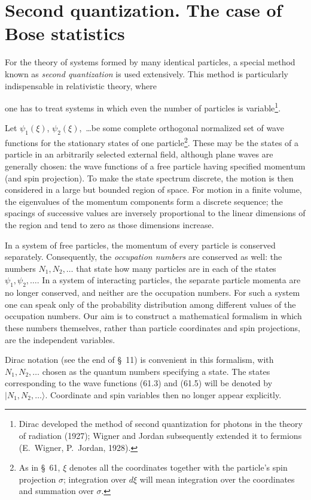 \section{Second quantization. The case of Bose statistics}

For the theory of systems formed by many identical particles, a special
method known as \emph{second quantization} is used extensively. This method is
particularly indispensable in relativistic theory, where

one has to treat systems in which even the number of particles is
variable\footnote{Dirac developed the method of second quantization for
photons in the theory of radiation (1927); Wigner and Jordan subsequently
extended it to fermions (E.~Wigner, P.~Jordan, 1928).}.

Let $\psi_1(\xi)$, $\psi_2(\xi)$,~\dots be some complete orthogonal normalized
set of wave functions for the stationary states of one
particle\footnote{As in \S~61, $\xi$ denotes all the coordinates together
with the particle's spin projection $\sigma$; integration over $d\xi$ will
mean integration over the coordinates and summation over $\sigma$.}. These
may be the states of a particle in an arbitrarily selected external field,
although plane waves are generally chosen: the wave functions of a free
particle having specified momentum (and spin projection). To make the state
spectrum discrete, the motion is then considered in a large but bounded
region of space. For motion in a finite volume, the eigenvalues of the
momentum components form a discrete sequence; the spacings of successive
values are inversely proportional to the linear dimensions of the region and
tend to zero as those dimensions increase.

In a system of free particles, the momentum of every particle is conserved
separately. Consequently, the \emph{occupation numbers} are conserved as
well: the numbers $N_1,N_2,\ldots$ that state how many particles are in each
of the states $\psi_1,\psi_2,\ldots$. In a system of interacting particles,
the separate particle momenta are no longer conserved, and neither are the
occupation numbers. For such a system one can speak only of the probability
distribution among different values of the occupation numbers. Our aim is to
construct a mathematical formalism in which these numbers themselves, rather
than particle coordinates and spin projections, are the independent
variables.

Dirac notation (see the end of \S~11) is convenient in this formalism, with
$N_1,N_2,\ldots$ chosen as the quantum numbers specifying a state. The states
corresponding to the wave functions (61.3) and (61.5) will be denoted by
$|N_1,N_2,\ldots\rangle$. Coordinate and spin variables then no longer appear
explicitly.

